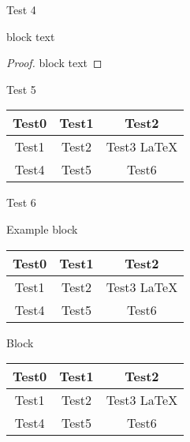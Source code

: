 \documentclass[t]{beamer}
\begin{document}
        \begin{frame}{Test 4}
            \begin{theorem}
            block text
            \end{theorem}
            
            \begin{proof}
            block text
            \end{proof}

        \end{frame}


        \begin{frame}{Test 5}

            \begin{tabular}{|c|c|c|}
            \hline
            \textbf{Test0} & \textbf{Test1} & \textbf{Test2} \\
            \hline
            Test1 & Test2 & Test3 \LaTeX  \\
            \hline
            Test4 & Test5& Test6\\
            \hline
            \end{tabular}
            
        \end{frame}

        \begin{frame}{Test 6}

            \begin{exampleblock}{Example block}
                \smallskip 

                \begin{tabular}{|c|c|c|}
                \hline
                \textbf{Test0} & \textbf{Test1} & \textbf{Test2} \\
                \hline
                Test1 & Test2 & Test3 \LaTeX  \\
                \hline
                Test4 & Test5& Test6\\
                \hline
                \end{tabular}
            \end{exampleblock}

            \begin{block}{Block}
                \smallskip 

                \begin{tabular}{|c|c|c|}
                \hline
                \textbf{Test0} & \textbf{Test1} & \textbf{Test2} \\
                \hline
                Test1 & Test2 & Test3 \LaTeX  \\
                \hline
                Test4 & Test5& Test6\\
                \hline
                \end{tabular}
            \end{block}
        \end{frame}
\end{document}
